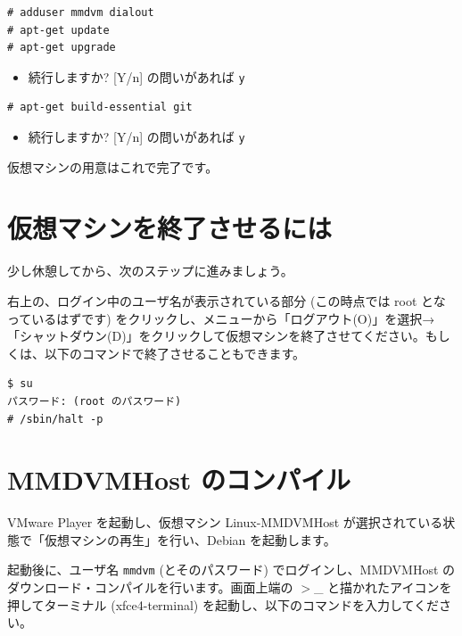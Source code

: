 \documentclass[a4j,oneside]{ujbook}
\begin{document}
\begin{verbatim}
# adduser mmdvm dialout
# apt-get update
# apt-get upgrade
\end{verbatim}
\begin{itemize}
 \renewcommand{\labelitemi}{$\triangleright$}
 \item 続行しますか? [Y/n] の問いがあれば \verb+y+
\end{itemize}
\begin{verbatim}
# apt-get build-essential git
\end{verbatim}
\begin{itemize}
 \renewcommand{\labelitemi}{$\triangleright$}
 \item 続行しますか? [Y/n] の問いがあれば \verb+y+
\end{itemize}

仮想マシンの用意はこれで完了です。 %

\section{仮想マシンを終了させるには}
少し休憩してから、次のステップに進みましょう。

右上の、ログイン中のユーザ名が表示されている部分 (この時点では root となっているはずです) をクリックし、メニューから「ログアウト(O)」を選択→「シャットダウン(D)」をクリックして仮想マシンを終了させてください。もしくは、以下のコマンドで終了させることもできます。

\begin{verbatim}
$ su
パスワード: (root のパスワード)
# /sbin/halt -p
\end{verbatim}

\section{MMDVMHost のコンパイル}

VMware Player を起動し、仮想マシン Linux-MMDVMHost が選択されている状態で「仮想マシンの再生」を行い、Debian を起動します。

起動後に、ユーザ名 \verb+mmdvm+ (とそのパスワード) でログインし、MMDVMHost のダウンロード・コンパイルを行います。画面上端の $>$\_ と描かれたアイコンを押してターミナル (xfce4-terminal) を起動し、以下のコマンドを入力してください。
\end{document}
